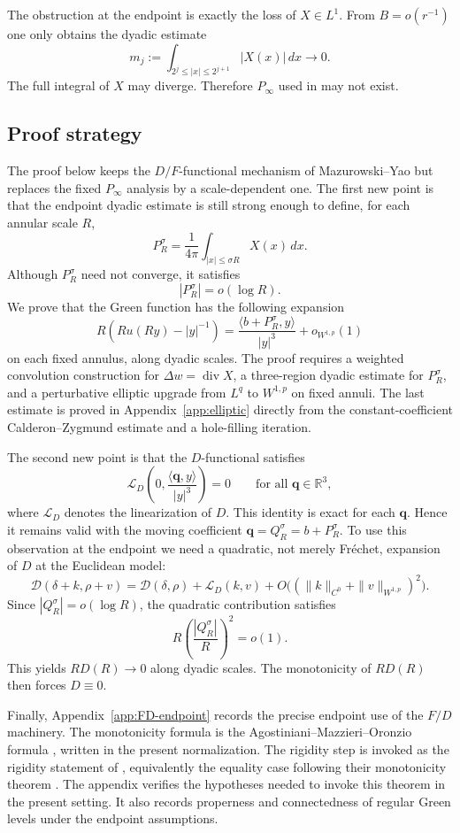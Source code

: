 \documentclass[11pt]{amsart}
\numberwithin{equation}{section}
\theoremstyle{definition}
\newcommand{\R}{\mathbb R}
\newcommand{\divE}{\operatorname{div}}
\newcommand{\LD}{\mathcal L_D}
\begin{document}
The obstruction at the endpoint is exactly the loss of $X\in L^1$.  From $B=o(r^{-1})$ one only obtains the dyadic estimate
$$
        m_j:=\int_{2^j\le |x|\le 2^{j+1}} |X(x)|\,dx\to0.
$$
The full integral of $X$ may diverge.  Therefore $P_\infty$ used in \cite{MYrigidity} may not exist.

\subsection{Proof strategy}
The proof below keeps the $D/F$-functional mechanism of Mazurowski--Yao \cite[Sections~3.1--3.3 and Appendix~A]{MYrigidity} but replaces the fixed $P_\infty$ analysis by a scale-dependent one.  The first new point is that the endpoint dyadic estimate is still strong enough to define, for each annular scale $R$,
$$
        P_R^\sigma=\frac1{4\pi}\int_{|x|\le \sigma R}X(x)\,dx.
$$
Although $P_R^\sigma$ need not converge, it satisfies
$$
        |P_R^\sigma|=o(\log R).
$$
We prove that the Green function has the following expansion
$$
        R\left(Ru(Ry)-|y|^{-1}\right)
        =\frac{\langle b+P_R^\sigma,y\rangle}{|y|^3}
        +o_{W^{1,p}}(1)
$$
on each fixed annulus, along dyadic scales. The proof requires a weighted convolution construction for $\Delta w=\divE X$, a three-region dyadic estimate for $P_R^\sigma$, and a perturbative elliptic upgrade from $L^q$ to $W^{1,p}$ on fixed annuli.  The last estimate is proved in Appendix~\ref{app:elliptic} directly from the constant-coefficient Calderon--Zygmund estimate and a hole-filling iteration.

The second new point is that the $D$-functional satisfies
$$
        \LD\left(0,\frac{\langle \mathbf q,y\rangle}{|y|^3}\right)=0
        \qquad\text{for all }\mathbf q\in\R^3,
$$
where $\mathcal L_D$ denotes the linearization of $D$. This identity is exact for each $\mathbf q$.  Hence it remains valid with the moving coefficient $\mathbf q=Q_R^\sigma=b+P_R^\sigma$.  To use this observation at the endpoint we need a quadratic, not merely Fr\'echet, expansion of $D$ at the Euclidean model:
$$
        \mathscr D(\delta+k,\rho+v)
        =\mathscr D(\delta,\rho)+\LD(k,v)
        +O\bigl((\|k\|_{C^0}+\|v\|_{W^{1,p}})^2\bigr).
$$
Since $|Q_R^\sigma|=o(\log R)$, the quadratic contribution satisfies
$$
        R\left(\frac{|Q_R^\sigma|}{R}\right)^2=o(1).
$$
This yields $R D(R)\to0$ along dyadic scales.  The monotonicity of $R D(R)$ then forces $D\equiv0$.

Finally, Appendix~\ref{app:FD-endpoint} records the precise endpoint use of the $F/D$ machinery.  The monotonicity formula is the Agostiniani--Mazzieri--Oronzio formula \cite[Theorem~1.1, formula~(1.3)]{AMO}, written in the present normalization.  The rigidity step is invoked as the rigidity statement of \cite[Corollary~1.3]{AMO}, equivalently the equality case following their monotonicity theorem \cite[Theorem~1.1]{AMO}.  The appendix verifies the hypotheses needed to invoke this theorem in the present setting.  It also records properness and connectedness of regular Green levels under the endpoint assumptions.
\end{document}
